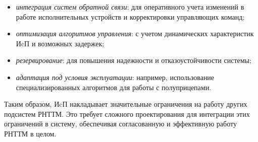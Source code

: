 \begin{itemize}[beginpenalty=10000, midpenalty=10000, wide=\parindent, leftmargin=0pt]
	\item \textit{интеграция систем обратной связи}: для оперативного учета изменений в работе исполнительных устройств и корректировки управляющих команд;

	\item \textit{оптимизация алгоритмов управления}: с учетом динамических характеристик ИcП и возможных задержек;

	\item \textit{резервирование}: для повышения надежности и отказоустойчивости системы;

	\item \textit{адаптация под условия эксплуатации}: например, использование специализированных алгоритмов для работы с полуприцепами.
\end{itemize}

Таким образом, ИcП накладывает значительные ограничения на работу других подсистем РНТТМ. Это требует сложного проектирования для интеграции этих ограничений в систему, обеспечивая согласованную и эффективную работу РНТТМ в целом.